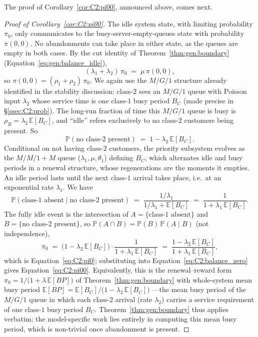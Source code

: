 The proof of Corollary~\ref{cor:C2:pi00}, announced above, comes next.
\begin{proof}[Proof of Corollary~\ref{cor:C2:pi00}]
    The idle system state, with limiting probability $\pi_0$, only communicates to the busy-server-empty-queues state with probability $\pi(0,0)$. No abandonments can take place in either state, as the queues are empty in both cases. By the cut identity of Theorem~\ref{thm:gen:boundary} (Equation~\eqref{eq:gen:balance_idle}),
    \begin{equation}
        (\lambda_1+\lambda_2)\,\pi_0 \;=\; \mu\,\pi(0,0),
        \label{eq:C2:balance_zero}
    \end{equation}
    so $\pi(0,0)=(\rho_1+\rho_2)\,\pi_0$.
    We again use the $M/G/1$ structure already identified in the stability discussion: class-$2$ sees an $M/G/1$ queue with Poisson input $\lambda_2$ whose service time is one class-$1$ busy period $B_C$ (made precise in \S\ref{ssec:C2:prob}). The long-run fraction of time this $M/G/1$ queue is busy is $\rho_B=\lambda_2\,\mathbb{E}[B_C]$, and ``idle'' refers exclusively to no class-$2$ customers being present. So
    \begin{equation*}
        \mathbb{P}(\text{no class-$2$ present}) \;=\; 1 - \lambda_2\,\mathbb{E}[B_C].
    \end{equation*}
    Conditional on not having class-$2$ customers, the priority subsystem evolves as the $M/M/1+M$ queue ($\lambda_1,\mu,\theta_1$) defining $B_C$, which alternates idle and busy periods in a renewal structure, whose regenerations are the moments it empties. An idle period lasts until the next class-$1$ arrival takes place, i.e.\ at an exponential rate $\lambda_1$. We have
    \begin{equation*}
        \mathbb{P}(\text{class-$1$ absent} \mid \text{no class-$2$ present})
        \;=\; \frac{1/\lambda_1}{1/\lambda_1+\mathbb{E}[B_C]}
        \;=\; \frac{1}{1+\lambda_1\,\mathbb{E}[B_C]}.
    \end{equation*}
    The fully idle event is the intersection of $A=\{\text{class-$1$ absent}\}$ and $B=\{\text{no class-$2$ present}\}$, so $\mathbb{P}(A\cap B)=\mathbb{P}(B)\,\mathbb{P}(A\mid B)$ (not independence),
    \begin{equation*}
        \pi_0 \;=\; \bigl(1-\lambda_2\,\mathbb{E}[B_C]\bigr)\cdot\frac{1}{1+\lambda_1\,\mathbb{E}[B_C]} \;=\; \frac{1-\lambda_2\,\mathbb{E}[B_C]}{1+\lambda_1\,\mathbb{E}[B_C]},
    \end{equation*}
    which is Equation~\eqref{eq:C2:pi0}; substituting into Equation~\eqref{eq:C2:balance_zero} gives Equation~\eqref{eq:C2:pi00}. Equivalently, this is the renewal--reward form $\pi_0=1/\bigl(1+\lambda\,\mathbb{E}[BP]\bigr)$ of Theorem~\ref{thm:gen:boundary} with whole-system mean busy period $\mathbb{E}[BP]=\mathbb{E}[B_C]/\bigl(1-\lambda_2\,\mathbb{E}[B_C]\bigr)$ ---the mean busy period of the $M/G/1$ queue in which each class-$2$ arrival (rate $\lambda_2$) carries a service requirement of one class-$1$ busy period $B_C$. Theorem~\ref{thm:gen:boundary} thus applies verbatim; the model-specific work lies entirely in computing this mean busy period, which is non-trivial once abandonment is present.
\end{proof}

